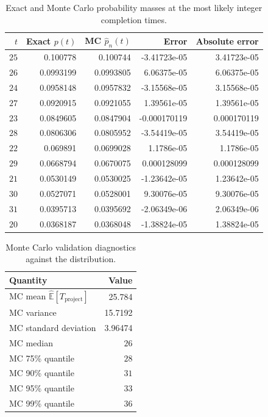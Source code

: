 \documentclass[11pt,a4paper]{article}
\newcommand{\1}{\mathbf{1}}
\theoremstyle{definition}
\theoremstyle{plain}
\theoremstyle{remark}
\numberwithin{equation}{section}
\begin{document}
\begin{table}
\centering
\caption{Exact and Monte Carlo probability masses at the most likely integer completion times.}
\label{tab:selected_discrete_pmf_values}
\begin{tabular}{rrrrr}
\toprule
$t$ & Exact $p(t)$ & MC $\widehat p_n(t)$ & Error & Absolute error \\
\midrule
$25$ & 0.100778 & 0.100744 & -3.41723e-05 & 3.41723e-05 \\
$26$ & 0.0993199 & 0.0993805 & 6.06375e-05 & 6.06375e-05 \\
$24$ & 0.0958148 & 0.0957832 & -3.15568e-05 & 3.15568e-05 \\
$27$ & 0.0920915 & 0.0921055 & 1.39561e-05 & 1.39561e-05 \\
$23$ & 0.0849605 & 0.0847904 & -0.000170119 & 0.000170119 \\
$28$ & 0.0806306 & 0.0805952 & -3.54419e-05 & 3.54419e-05 \\
$22$ & 0.069891 & 0.0699028 & 1.1786e-05 & 1.1786e-05 \\
$29$ & 0.0668794 & 0.0670075 & 0.000128099 & 0.000128099 \\
$21$ & 0.0530149 & 0.0530025 & -1.23642e-05 & 1.23642e-05 \\
$30$ & 0.0527071 & 0.0528001 & 9.30076e-05 & 9.30076e-05 \\
$31$ & 0.0395713 & 0.0395692 & -2.06349e-06 & 2.06349e-06 \\
$20$ & 0.0368187 & 0.0368048 & -1.38824e-05 & 1.38824e-05 \\
\bottomrule
\end{tabular}
\end{table}



\begin{table}[H]
\centering

\caption{Monte Carlo validation diagnostics against the distribution.}
\label{tab:mc_validation_diagnostics}


\begin{tabular}{lr}
\toprule
Quantity & Value \\
\midrule
MC mean $\widehat{\mathbb{E}}[T_{\mathrm{project}}]$ & 25.784 \\
MC variance & 15.7192 \\
MC standard deviation & 3.96474 \\
MC median & $26$ \\
MC 75\% quantile & $28$ \\
MC 90\% quantile & $31$ \\
MC 95\% quantile & $33$ \\
MC 99\% quantile & $36$ \\
\bottomrule
\end{tabular}

\end{table}
\end{document}
